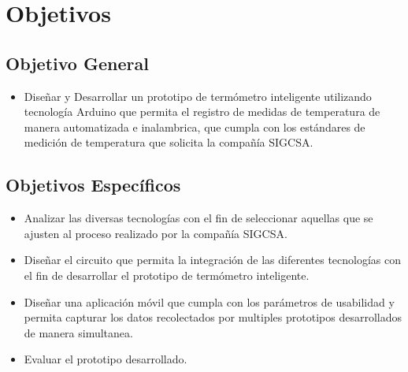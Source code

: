 \section{Objetivos}

\subsection{Objetivo General}

\begin{itemize}
	
\item 
Diseñar y Desarrollar un prototipo de termómetro inteligente utilizando tecnología Arduino que permita el registro de medidas de temperatura de manera automatizada e inalambrica, que cumpla con los estándares de medición de temperatura que solicita la compañía SIGCSA.
	
\end{itemize}

\subsection{Objetivos Específicos}

\begin{itemize}
	
\item 
Analizar las diversas tecnologías con el fin de seleccionar aquellas que se ajusten al proceso realizado por la compañía SIGCSA.

\item 
Diseñar el circuito que permita la integración de las diferentes tecnologías con el fin de desarrollar el prototipo de termómetro inteligente.

\item 
Diseñar una aplicación móvil que cumpla con los parámetros de usabilidad y permita capturar los datos recolectados por multiples prototipos desarrollados de manera simultanea.

\item 
Evaluar el prototipo desarrollado.
	
\end{itemize}